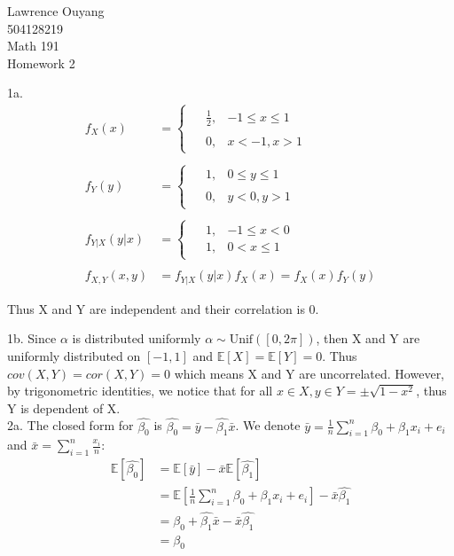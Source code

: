 \documentclass[12pt]{article}
\begin{document}
\begin{flushright}
Lawrence Ouyang\\
504128219\\
Math 191\\
Homework 2\\
\end{flushright}

1a.
\begin{align} \nonumber
f_X(x) &=  
  \begin{cases}
  \begin{aligned}
  & \frac{1}{2}, &  -1 \leq x \leq 1 \\ \\
  & 0, & x < -1, x > 1
  \end{aligned}
  \end{cases} \\ \nonumber \\ \nonumber
f_Y(y) &=  
    \begin{cases}
    \begin{aligned}
    & 1, &  0 \leq y \leq 1 \\ \\
    & 0, & y < 0, y > 1
    \end{aligned}
    \end{cases} \\ \nonumber \\ \nonumber
f_{Y|X}(y|x) &= 
  \begin{cases}
  \begin{aligned}
  & 1, & -1 \leq x < 0 \\
  & 1, & 0 < x \leq 1
  \end{aligned}
  \end{cases} \\ \nonumber \\ \nonumber
f_{X,Y}(x,y) &= f_{Y|X}(y|x)f_X(x) = f_X(x)f_Y(y)
\end{align}
\begin{center}
Thus X and Y are independent and their correlation is 0.
\end{center}
1b. Since $\alpha$ is distributed uniformly $ \alpha \sim \mbox{Unif}([0 , 2 \pi])$, then X and Y are uniformly distributed on $[-1,1]$ and $\mathbb{E}[X] = \mathbb{E}[Y] = 0$. Thus $cov(X,Y) = cor(X,Y) = 0$ which means X and Y are uncorrelated. However, by trigonometric identities, we notice that for all $x \in X, y \in Y = \pm\sqrt{1-x^2}$, thus Y is dependent of X. \\

2a. The closed form for $\hat{\beta_0}$ is $\hat{\beta_0} = \bar{y} - \hat{\beta_1}\bar{x}$. We denote $\bar{y} = \frac{1}{n}\sum_{i=1}^{n}\beta_0 + \beta_1x_i + e_i$ and $\bar{x} = \sum_{i = 1}^{n}\frac{x_i}{n}$:
\begin{align} \nonumber
\mathbb{E}[\hat{\beta_0}] &= \mathbb{E}[\bar{y}] - \bar{x}\mathbb{E}[\hat{\beta_1}] \\ \nonumber
&= \mathbb{E}[\frac{1}{n}\sum_{i=1}^{n}\beta_0 + \beta_1x_i + e_i] - \bar{x}\hat{\beta_1} \\ \nonumber
&= \beta_0 + \hat{\beta_1}\bar{x} - \bar{x}\hat{\beta_1} \\ \nonumber
&= \beta_0
\end{align}
\end{document}
